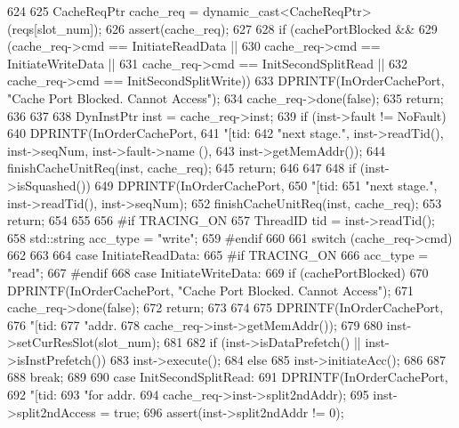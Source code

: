 \begin{DoxyCode}
624 {
625     CacheReqPtr cache_req = dynamic_cast<CacheReqPtr>(reqs[slot_num]);
626     assert(cache_req);
627 
628     if (cachePortBlocked &&
629         (cache_req->cmd == InitiateReadData ||
630          cache_req->cmd == InitiateWriteData ||
631          cache_req->cmd == InitSecondSplitRead ||
632          cache_req->cmd == InitSecondSplitWrite)) {
633         DPRINTF(InOrderCachePort, "Cache Port Blocked. Cannot Access\n");
634         cache_req->done(false);
635         return;
636     }
637 
638     DynInstPtr inst = cache_req->inst;
639     if (inst->fault != NoFault) {
640         DPRINTF(InOrderCachePort,
641                 "[tid:%
642                 "next stage.\n", inst->readTid(), inst->seqNum, inst->fault->name
      (),
643                 inst->getMemAddr());
644         finishCacheUnitReq(inst, cache_req);
645         return;
646     }
647 
648     if (inst->isSquashed()) {
649         DPRINTF(InOrderCachePort,
650                 "[tid:%
651                 "next stage.\n", inst->readTid(), inst->seqNum);
652         finishCacheUnitReq(inst, cache_req);
653         return;
654     }
655 
656 #if TRACING_ON
657     ThreadID tid = inst->readTid();
658     std::string acc_type = "write";
659 #endif
660 
661     switch (cache_req->cmd)
662     {
663 
664       case InitiateReadData:
665 #if TRACING_ON
666         acc_type = "read";
667 #endif        
668       case InitiateWriteData:
669         if (cachePortBlocked) {
670             DPRINTF(InOrderCachePort, "Cache Port Blocked. Cannot Access\n");
671             cache_req->done(false);
672             return;
673         }
674 
675         DPRINTF(InOrderCachePort,
676                 "[tid:%
677                 "addr. %
678                 cache_req->inst->getMemAddr());
679 
680         inst->setCurResSlot(slot_num);
681 
682         if (inst->isDataPrefetch() || inst->isInstPrefetch()) {
683             inst->execute();
684         } else {
685             inst->initiateAcc();
686         }
687         
688         break;
689 
690       case InitSecondSplitRead:
691         DPRINTF(InOrderCachePort,
692                 "[tid:%
693                 "for addr. %
694                 cache_req->inst->split2ndAddr);
695         inst->split2ndAccess = true;
696         assert(inst->split2ndAddr != 0);
}}
\end{DoxyCode}

